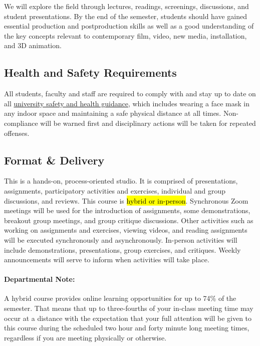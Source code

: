 We will explore the field through lectures, readings, screenings, discussions, and student presentations. By the end of the semester, students should have gained essential production and postproduction skills as well as a good understanding of the key concepts relevant to contemporary film, video, new media, installation, and 3D animation.

\subsection{Health and Safety Requirements}

All students, faculty and staff are required to comply with and stay up to date on all \href{https://safeandhealthy.osu.edu}{university safety and health guidance}, which includes wearing a face mask in any indoor space and maintaining a safe physical distance at all times. Non-compliance will be warned first and disciplinary actions will be taken for repeated offenses.

\subsection{Format \& Delivery}

This is a hands-on, process-oriented studio. It is comprised of presentations, assignments, participatory activities and exercises, individual and group discussions, and reviews. This course is \hl{hybrid or in-person}. Synchronous Zoom meetings will be used for the introduction of assignments, some demonstrations, breakout group meetings, and group critique discussions. Other activities such as working on assignments and exercises, viewing videos, and reading assignments will be executed synchronously and asynchronously. In-person activities will include demonstrations, presentations, group exercises, and critiques. Weekly announcements will serve to inform when activities will take place.

\paragraph{Departmental Note:} A hybrid course provides online learning opportunities for up to 74\% of the semester. That means that up to three-fourths of your in-class meeting time may occur at a distance with the expectation that your full attention will be given to this course during the scheduled two hour and forty minute long meeting times, regardless if you are meeting physically or otherwise.

